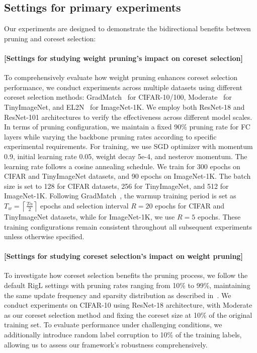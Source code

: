 \subsection{Settings for primary experiments}
Our experiments are designed to demonstrate the bidirectional benefits between pruning and coreset selection:
\paragraph{[Settings for studying weight pruning's impact on coreset selection]} To comprehensively evaluate how weight pruning enhances coreset selection performance, we conduct experiments across multiple datasets using different coreset selection methods: GradMatch~\cite{killamsetty2021grad} for CIFAR-10/100, Moderate~\cite{xia2022moderate} for TinyImageNet, and EL2N~\cite{paul2021deep} for ImageNet-1K. We employ both ResNet-18 and ResNet-101 architectures to verify the effectiveness across different model scales. In terms of pruning configuration, we maintain a fixed 90\% pruning rate for FC layers while varying the backbone pruning rates according to specific experimental requirements. For training, we use SGD optimizer with momentum 0.9, initial learning rate 0.05, weight decay 5e-4, and nesterov momentum. The learning rate follows a cosine annealing schedule. We train for 300 epochs on CIFAR and TinyImageNet datasets, and 90 epochs on ImageNet-1K. The batch size is set to 128 for CIFAR datasets, 256 for TinyImageNet, and 512 for ImageNet-1K. Following GradMatch~\cite{killamsetty2021grad}, the warmup training period is set as $T_w = \left\lceil\frac{T\alpha}{2}\right\rceil$ epochs and selection interval $R=20$ epochs for CIFAR and TinyImageNet datasets, while for ImageNet-1K, we use $R=5$ epochs. These training configurations remain consistent throughout all subsequent experiments unless otherwise specified.

\paragraph{[Settings for studying coreset selection's impact on weight pruning]} To investigate how coreset selection benefits the pruning process, we follow the default RigL settings with pruning rates ranging from 10\% to 99\%, maintaining the same update frequency and sparsity distribution as described in~\cite{evci2020rigging}. We conduct experiments on CIFAR-10 using ResNet-18 architecture, with Moderate~\cite{xia2022moderate} as our coreset selection method and fixing the coreset size at 10\% of the original training set. To evaluate performance under challenging conditions, we additionally introduce random label corruption to 10\% of the training labels, allowing us to assess our framework's robustness comprehensively.

